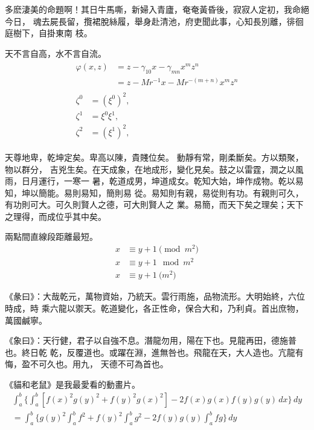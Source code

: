 多麽淒美的命題啊！其日牛馬嘶，新婦入青廬，奄奄黃昏後，寂寂人定初，我命絕今日，
魂去屍長留，攬裙脫絲履，舉身赴清池，府吏聞此事，心知長別離，徘徊庭樹下，自掛東南
枝。

\begin{remark}
天不言自高，水不言自流。
\begin{gather*}
\begin{split} 
\varphi(x,z)
&=z-\gamma_{10}x-\gamma_{mn}x^mz^n\\
&=z-Mr^{-1}x-Mr^{-(m+n)}x^mz^n
\end{split}\\[6pt]
\begin{align} \zeta^0&=(\xi^0)^2,\\
\zeta^1 &=\xi^0\xi^1,\\
\zeta^2 &=(\xi^1)^2,
\end{align}
\end{gather*}
\end{remark}

天尊地卑，乾坤定矣。卑高以陳，貴賤位矣。 動靜有常，剛柔斷矣。方以類聚，物以群分，
吉兇生矣。在天成象，在地成形，變化見矣。鼓之以雷霆，潤之以風雨，日月運行，一寒一
暑，乾道成男，坤道成女。乾知大始，坤作成物。乾以易知，坤以簡能。易則易知，簡則易
從。易知則有親，易從則有功。有親則可久，有功則可大。可久則賢人之德，可大則賢人之
業。易簡，而天下矣之理矣；天下之理得，而成位乎其中矣。

\begin{axiom}
兩點間直線段距離最短。  
\begin{align}
x&\equiv y+1\pmod{m^2}\\
x&\equiv y+1\mod{m^2}\\
x&\equiv y+1\pod{m^2}
\end{align}
\end{axiom}

《彖曰》：大哉乾元，萬物資始，乃統天。雲行雨施，品物流形。大明始終，六位時成，時
乘六龍以禦天。乾道變化，各正性命，保合大和，乃利貞。首出庶物，萬國鹹寧。

《象曰》：天行健，君子以自強不息。潛龍勿用，陽在下也。見龍再田，德施普也。終日乾
乾，反覆道也。或躍在淵，進無咎也。飛龍在天，大人造也。亢龍有悔，盈不可久也。用九，
天德不可為首也。 　　

\begin{lemma}
《貓和老鼠》是我最愛看的動畫片。
\begin{multline*}%
\int_a^b\biggl\{\int_a^b[f(x)^2g(y)^2+f(y)^2g(x)^2]
 -2f(x)g(x)f(y)g(y)\,dx\biggr\}\,dy \\
 =\int_a^b\biggl\{g(y)^2\int_a^bf^2+f(y)^2
  \int_a^b g^2-2f(y)g(y)\int_a^b fg\biggr\}\,dy
\end{multline*}
\end{lemma}


